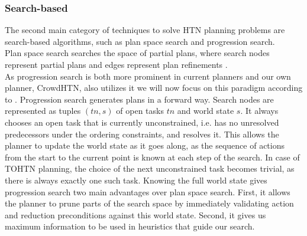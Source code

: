 \begin{comment}
- may translate to classical planning \cite{alford2016bound}
- SAT-based has been known since 1998 \cite{mali1998encoding}
- tend to explore the hierarchy layer-by-layer \cite{schreiber2019tree}
- this gives the search a BFS-like characteristic
- this is needed, as SAT is NP-complete compared to HTN which is undecidable and TOHTN which is in D-EXPTIME \ref{prelim: tohtn complexity}
- encoding the whole instance would be impossible in case of HTN and lead to blowup in instance size in case of TOHTN
- going bit by bit is done instead

- example planners are Tree-REX \cite{schreiber2019tree}, totSAT \cite{behnke2018totsat}, Lilotane \cite{schreiber2021lilotane}
\end{comment}

\subsubsection{Search-based}
\label{prelim: techniques search}
The second main category of techniques to solve HTN planning problems are search-based algorithms, such as plan space search and progression search. \\
Plan space search searches the space of partial plans, where search nodes represent partial plans and edges represent plan refinements \cite{weld1994introduction}. \\
As progression search is both more prominent in current planners and our own planner, CrowdHTN, also utilizes it we will now focus on this paradigm according to \cite{holler2020htn}.
Progression search generates plans in a forward way. Search nodes are represented as tuples $(tn, s)$ of open tasks $tn$ and world state $s$. It always chooses an open task that is currently unconstrained, i.e. has no unresolved predecessors under the ordering constraints, and resolves it. This allows the planner to update the world state as it goes along, as the sequence of actions from the start to the current point is known at each step of the search. In case of TOHTN planning, the choice of the next unconstrained task becomes trivial, as there is always exactly one such task. Knowing the full world state gives progression search two main advantages over plan space search. First, it allows the planner to prune parts of the search space by immediately validating action and reduction preconditions against this world state. Second, it gives us maximum information to be used in heuristics that guide our search. \\
